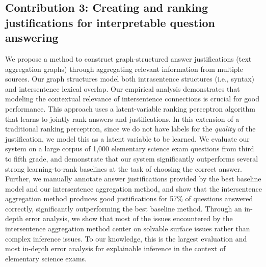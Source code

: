 \subsection{Contribution 3: Creating and ranking justifications for interpretable question answering} We propose a method to construct graph-structured answer justifications (text aggregation graphs) through aggregating relevant information from multiple sources.  Our graph structures model both intrasentence structures (i.e., syntax) and intersentence lexical overlap.
Our empirical analysis demonstrates that modeling the contextual relevance of intersentence connections is crucial for good performance.  %
This approach uses a latent-variable ranking perceptron algorithm that learns to jointly rank answers and justifications.  In this extension of a traditional ranking perceptron, since we do not have labels for the  \emph{quality} of the justification, we model this as a latent variable to be learned. 
We evaluate our system on a large corpus of 1,000 elementary science exam questions from third to fifth grade, and demonstrate that our system significantly outperforms several strong learning-to-rank baselines at the task of choosing the correct answer.  Further, we manually annotate answer justifications provided by the best baseline model and our intersentence aggregation method, and show that the intersentence aggregation method produces good justifications for 57\% of questions answered correctly, significantly outperforming the best baseline method. 
Through an in-depth error analysis, we show that most of the issues encountered by the intersentence aggregation method center on solvable surface issues rather than complex inference issues.  To our knowledge, this is the largest evaluation and most in-depth error analysis for explainable inference in the context of elementary science exams. 


